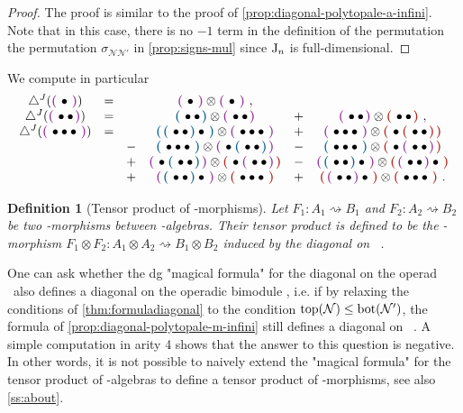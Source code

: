 \documentclass[twoside, 11pt]{amsart}
\newtheorem{definition}{Definition}[section]
\theoremstyle{remark}
\begin{document}
\begin{proof}
The proof is similar to the proof of \cref{prop:diagonal-polytopale-a-infini}. 
Note that in this case, there is no $-1$ term in the definition of the permutation the permutation $\sigma_{\mathcal{N}\mathcal{N}'}$ in \cref{prop:signs-mul} since $\mathrm{J}_n$ is full-dimensional. 
\end{proof}

We compute in particular 
\[
\begin{matrix}
\diagminf ( \purple{ \bullet } )  
&=&  & \purple{ \bullet } \otimes \purple{ \bullet } \ , & &  \\
\diagminf ( \purple{ \bullet \bullet } ) 
&=& & \blue{\bullet \bullet} \otimes \purple{\bullet \bullet} & + & \purple{\bullet \bullet} \otimes \red{\bullet \bullet} \ , \\
\diagminf (\purple{\bullet \bullet \bullet}) 
&=& 
& \blue{\blue{\bullet \bullet}\bullet} \otimes \purple{\bullet \bullet \bullet} 
& + & \purple{\bullet \bullet \bullet} \otimes \red{\bullet \red{\bullet \bullet}} \\
& &- &  \blue{\bullet \bullet \bullet} \otimes \purple{\bullet \blue{\bullet \bullet}}    &  - & \blue{\bullet \bullet \bullet} \otimes \red{\bullet \purple{\bullet \bullet}}  \\  &   &+ & \purple{\bullet \blue{\bullet \bullet}} \otimes \red{\bullet \purple{\bullet \bullet}} 
  &  - & \purple{\blue{\bullet \bullet} \bullet} \otimes \red{\purple{\bullet \bullet} \bullet} \\ & &  + & \purple{\blue{\bullet \bullet} \bullet} \otimes \red{\bullet \bullet \bullet}   &  + & \red{\purple{\bullet \bullet} \bullet} \otimes \red{\bullet \bullet \bullet} \ .
  \end{matrix}
\]

\begin{definition}[Tensor product of \Ainf -morphisms] \label{def:tensor-ainf-morph}
Let $F_1 : A_1 \rightsquigarrow B_1$ and $F_2 : A_2 \rightsquigarrow B_2$ be two \Ainf -morphisms between \Ainf-algebras.
Their tensor product is defined to be the \Ainf -morphism $F_1 \otimes F_2 : A_1 \otimes A_2 \rightsquigarrow B_1 \otimes B_2$ induced by the diagonal \diagminf on \Minf \ .
\end{definition}

One can ask whether the dg "magical formula" for the diagonal on the operad \Ainf\
also defines a diagonal on the operadic bimodule \Minf, i.e. if by relaxing the conditions of \cref{thm:formuladiagonal} to the condition $\operatorname{top}(\mathcal{N}) \leq \operatorname{bot}(\mathcal{N'})$, the formula of \cref{prop:diagonal-polytopale-m-infini} still defines a diagonal on \Minf \ . A simple computation in arity 4 shows that the answer to this question is negative. In other words, it is not possible to naively extend the "magical formula" for the tensor product of \Ainf -algebras to define a tensor product of \Ainf -morphisms, see also \cref{ss:about}.
\end{document}
